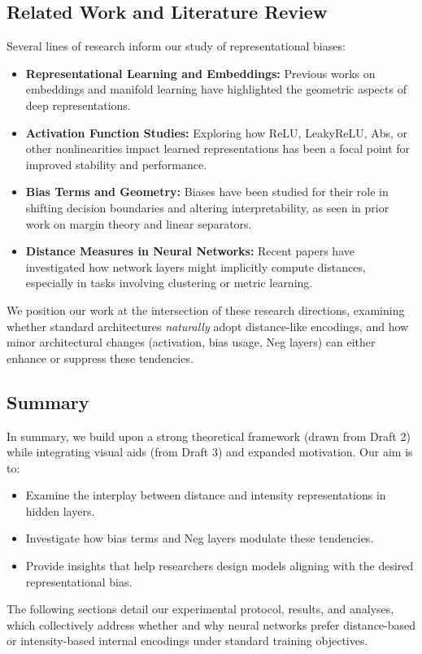 \subsection{Related Work and Literature Review}
Several lines of research inform our study of representational biases:
\begin{itemize}
    \item \textbf{Representational Learning and Embeddings:} Previous works on embeddings and manifold learning have highlighted the geometric aspects of deep representations. 
    \item \textbf{Activation Function Studies:} Exploring how ReLU, LeakyReLU, Abs, or other nonlinearities impact learned representations has been a focal point for improved stability and performance.
    \item \textbf{Bias Terms and Geometry:} Biases have been studied for their role in shifting decision boundaries and altering interpretability, as seen in prior work on margin theory and linear separators.
    \item \textbf{Distance Measures in Neural Networks:} Recent papers have investigated how network layers might implicitly compute distances, especially in tasks involving clustering or metric learning.
\end{itemize}
We position our work at the intersection of these research directions, examining whether standard architectures \emph{naturally} adopt distance-like encodings, and how minor architectural changes (activation, bias usage, Neg layers) can either enhance or suppress these tendencies.

\subsection{Summary}
In summary, we build upon a strong theoretical framework (drawn from Draft 2) while integrating visual aids (from Draft 3) and expanded motivation. Our aim is to:
\begin{itemize}
    \item Examine the interplay between distance and intensity representations in hidden layers.
    \item Investigate how bias terms and Neg layers modulate these tendencies.
    \item Provide insights that help researchers design models aligning with the desired representational bias.
\end{itemize}
The following sections detail our experimental protocol, results, and analyses, which collectively address whether and why neural networks prefer distance-based or intensity-based internal encodings under standard training objectives.

